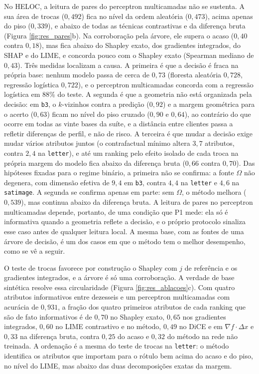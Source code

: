 No HELOC, a leitura de pares do perceptron multicamadas não se sustenta. A sua área de trocas ($0{,}492$) fica no nível da ordem aleatória ($0{,}473$), acima apenas do piso ($0{,}339$), e abaixo de todas as técnicas contrastivas e da diferença bruta (Figura \ref{fig:res_pares}b). Na corroboração pela árvore, ele supera o acaso ($0{,}40$ contra $0{,}18$), mas fica abaixo do Shapley exato, dos gradientes integrados, do SHAP e do LIME, e concorda pouco com o Shapley exato (Spearman mediano de $0{,}43$). Três medidas localizam a causa. A primeira é que a decisão é fraca na própria base: nenhum modelo passa de cerca de $0{,}73$ (floresta aleatória $0{,}728$, regressão logística $0{,}722$), e o perceptron multicamadas concorda com a regressão logística em 88\% do teste. A segunda é que a geometria não está organizada pela decisão: em \texttt{b3}, o $k$-vizinhos contra a predição ($0{,}92$) e a margem geométrica para o acerto ($0{,}63$) ficam no nível do piso cruzado ($0{,}90$ e $0{,}64$), ao contrário do que ocorre em todas as vinte bases da suíte, e a distância entre clientes passa a refletir diferenças de perfil, e não de risco. A terceira é que mudar a decisão exige mudar vários atributos juntos (o contrafactual mínimo altera $3{,}7$ atributos, contra $2{,}4$ na \texttt{letter}), e até um ranking pelo efeito isolado de cada troca na própria margem do modelo fica abaixo da diferença bruta ($0{,}66$ contra $0{,}70$). Das hipóteses fixadas para o regime binário, a primeira não se confirma: a fonte $\Omega$ não degenera, com dimensão efetiva de $9{,}4$ em \texttt{b3}, contra $4{,}4$ na \texttt{letter} e $4{,}6$ na \texttt{satimage}. A segunda se confirma apenas em parte: sem $\Omega$, o método melhora ($0{,}539$), mas continua abaixo da diferença bruta. A leitura de pares no perceptron multicamadas depende, portanto, de uma condição que P1 mede: ela só é informativa quando a geometria reflete a decisão, e o próprio protocolo sinaliza esse caso antes de qualquer leitura local. A mesma base, com as fontes de uma árvore de decisão, é um dos casos em que o método tem o melhor desempenho, como se vê a seguir.

O teste de trocas favorece por construção o Shapley com $j$ de referência e os gradientes integrados, e a árvore é só uma corroboração. A verdade de base sintética resolve essa circularidade (Figura \ref{fig:res_ablacoes}c). Com quatro atributos informativos entre dezesseis e um perceptron multicamadas com acurácia de $0{,}931$, a fração dos quatro primeiros atributos de cada ranking que são de fato informativos é de $0{,}70$ no Shapley exato, $0{,}65$ nos gradientes integrados, $0{,}60$ no LIME contrastivo e no método, $0{,}49$ no DiCE e em $\nabla f\cdot\Delta x$ e $0{,}33$ na diferença bruta, contra $0{,}25$ do acaso e $0{,}32$ do método na rede não treinada. A ordenação é a mesma do teste de trocas na \texttt{letter}: o método identifica os atributos que importam para o rótulo bem acima do acaso e do piso, no nível do LIME, mas abaixo das duas decomposições exatas da margem.

